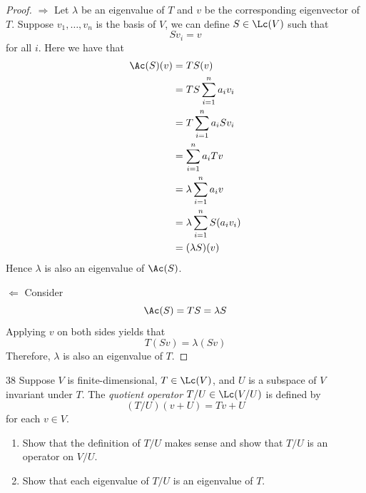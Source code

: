 \documentclass{extarticle}
\begin{document}
\begin{proof}
    \(\Rightarrow\) Let \(\lambda\) be an eigenvalue of \(T\) and \(v\) be the corresponding 
    eigenvector of \(T\).  Suppose \(v_1, \ldots, v_n\) is the basis of \(V\), we can define 
    \(S \in \Lc(V)\) such that 
    \[S v_i = v\]
    for all \(i\). Here we have that 
    \begin{align*}
        \Ac(S)(v) 
        &= TS(v) \\ 
        &= TS \sum_{i=1}^{n} a_i v_i \\ 
        &= T\sum_{i=1}^{n} a_i Sv_i \\ 
        &= \sum_{i=1}^{n} a_i Tv \\ 
        &= \lambda \sum_{i=1}^{n} a_i v  \\ 
        &= \lambda \sum_{i=1}^{n} S (a_i v_i) \\ 
        &= (\lambda S) (v) 
    \end{align*}
    Hence \(\lambda\) is also an eigenvalue of \(\Ac(S)\).


    \(\Leftarrow\) Consider 
    \[\Ac(S) = TS = \lambda S\] 
    Applying \(v\) on both sides yields that 
    \[T(Sv) = \lambda(Sv)\]
    Therefore, \(\lambda\) is also an eigenvalue of \(T\).
\end{proof}

\begin{problem}{38}
    Suppose \(V\) is finite-dimensional, \(T \in \Lc(V)\), and \(U\) is a subspace 
    of \(V\) invariant under \(T\). The \emph{quotient operator} \(T/U \in \Lc(V/U)\) 
    is defined by 
    \[(T/U)(v + U) = Tv + U\]
    for each \(v \in V\). 
    \begin{enumerate}[label=(\alph*)]
        \item Show that the definition of \(T/U\) makes sense and show that \(T/U\) is an operator 
        on \(V/U\).
        \item Show that each eigenvalue of \(T/U\) is an eigenvalue of \(T\). 
    \end{enumerate}
\end{problem}
\end{document}
